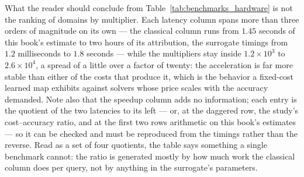 What the reader should conclude from Table~\ref{tab:benchmarks_hardware} is not
the ranking of domains by multiplier. Each latency column spans more than three
orders of magnitude on its own --- the classical column runs from $1.45$ seconds
of this book's estimate to two hours of its attribution, the surrogate timings from $1.2$ milliseconds to $1.8$ seconds ---
while the multipliers stay inside
$1.2\times10^{3}$ to $2.6\times10^{4}$, a spread of a little over a factor of twenty: the
acceleration is far more stable than either of the costs that produce it, which is
the behavior a fixed-cost learned map exhibits against solvers whose price scales
with the accuracy demanded. Note also that the speedup column adds no information;
each entry is the quotient of the two latencies to its left --- or, at the daggered row,
the study's cost--accuracy ratio, and at the first two rows arithmetic on this book's
estimates --- so it can be checked and must be
reproduced from the timings rather than the reverse. Read as a set of four
quotients, the table says something a single benchmark cannot: the ratio is
generated mostly by how much work the classical column does per query, not by
anything in the surrogate's parameters.

